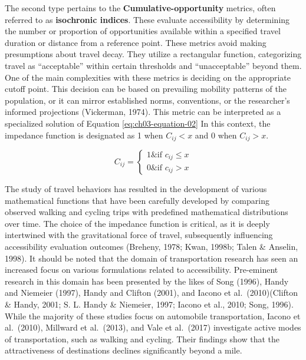 \documentclass[
11pt, %
oneside, %
english, %
singlespacing, %
]{macthesis} %
\begin{document}
The second type pertains to the \textbf{Cumulative-opportunity} metrics, often referred to as \textbf{isochronic indices}. These evaluate accessibility by determining the number or proportion of opportunities available within a specified travel duration or distance from a reference point. These metrics avoid making presumptions about travel decay. They utilize a rectangular function, categorizing travel as ``acceptable'' within certain thresholds and ``unacceptable'' beyond them. One of the main complexities with these metrics is deciding on the appropriate cutoff point. This decision can be based on prevailing mobility patterns of the population, or it can mirror established norms, conventions, or the researcher's informed projections (Vickerman, 1974). This metric can be interpreted as a specialized solution of Equation \ref{eq:ch03-equation-02} In this context, the impedance function is designated as 1 when \(C_{ij}< x\) and 0 when \(C_{ij} > x\).

\begin{equation}
C_{ij} =
\begin{cases}
  1 \& \text{if } c_{ij} \le x \\
  0 \& \text{if } c_{ij} > x
\end{cases}
\label{eq:ch03-equation-02}
\end{equation}

The study of travel behaviors has resulted in the development of various mathematical functions that have been carefully developed by comparing observed walking and cycling trips with predefined mathematical distributions over time. The choice of the impedance function is critical, as it is deeply intertwined with the gravitational force of travel, subsequently influencing accessibility evaluation outcomes (Breheny, 1978; Kwan, 1998b; Talen \& Anselin, 1998). It should be noted that the domain of transportation research has seen an increased focus on various formulations related to accessibility. Pre-eminent research in this domain has been presented by the likes of Song (1996), Handy and Niemeier (1997), Handy and Clifton (2001), and Iacono et al.~(2010)(Clifton \& Handy, 2001; S. L. Handy \& Niemeier, 1997; Iacono et al., 2010; Song, 1996). While the majority of these studies focus on automobile transportation, Iacono et al.~(2010), Millward et al.~(2013), and Vale et al.~(2017) investigate active modes of transportation, such as walking and cycling. Their findings show that the attractiveness of destinations declines significantly beyond a mile.
\end{document}
